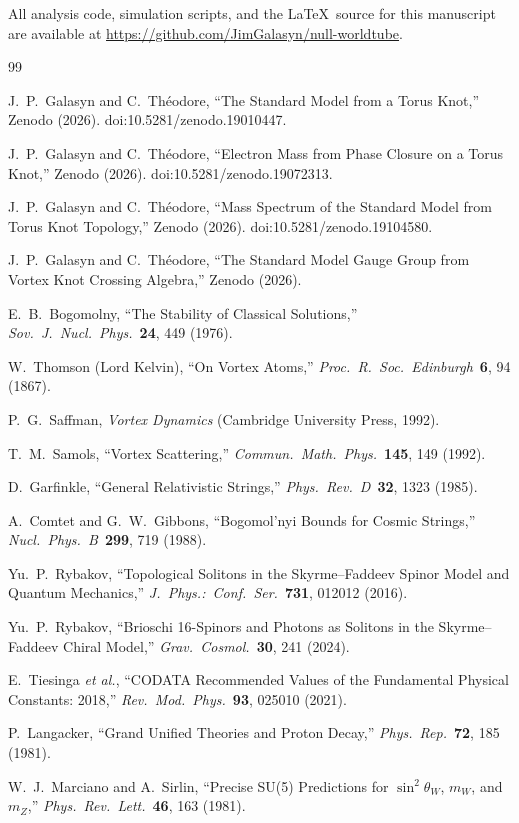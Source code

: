 \documentclass[11pt]{article}
\begin{document}
All analysis code, simulation scripts, and the \LaTeX\ source for this manuscript are available at \url{https://github.com/JimGalasyn/null-worldtube}.

\begin{thebibliography}{99}

J.~P.~Galasyn and C.~Th\'eodore,
``The Standard Model from a Torus Knot,''
Zenodo (2026). doi:10.5281/zenodo.19010447.

J.~P.~Galasyn and C.~Th\'eodore,
``Electron Mass from Phase Closure on a Torus Knot,''
Zenodo (2026). doi:10.5281/zenodo.19072313.

J.~P.~Galasyn and C.~Th\'eodore,
``Mass Spectrum of the Standard Model from Torus Knot Topology,''
Zenodo (2026). doi:10.5281/zenodo.19104580.

J.~P.~Galasyn and C.~Th\'eodore,
``The Standard Model Gauge Group from Vortex Knot Crossing Algebra,''
Zenodo (2026).

E.~B.~Bogomolny,
``The Stability of Classical Solutions,''
\emph{Sov.\ J.\ Nucl.\ Phys.}\ \textbf{24}, 449 (1976).

W.~Thomson (Lord Kelvin),
``On Vortex Atoms,''
\emph{Proc.\ R.\ Soc.\ Edinburgh}\ \textbf{6}, 94 (1867).

P.~G.~Saffman,
\emph{Vortex Dynamics} (Cambridge University Press, 1992).

T.~M.~Samols,
``Vortex Scattering,''
\emph{Commun.\ Math.\ Phys.}\ \textbf{145}, 149 (1992).

D.~Garfinkle,
``General Relativistic Strings,''
\emph{Phys.\ Rev.\ D}\ \textbf{32}, 1323 (1985).

A.~Comtet and G.~W.~Gibbons,
``Bogomol'nyi Bounds for Cosmic Strings,''
\emph{Nucl.\ Phys.\ B}\ \textbf{299}, 719 (1988).

Yu.~P.~Rybakov,
``Topological Solitons in the Skyrme--Faddeev Spinor Model and
Quantum Mechanics,''
\emph{J.\ Phys.:\ Conf.\ Ser.}\ \textbf{731}, 012012 (2016).

Yu.~P.~Rybakov,
``Brioschi 16-Spinors and Photons as Solitons in the Skyrme--Faddeev
Chiral Model,''
\emph{Grav.\ Cosmol.}\ \textbf{30}, 241 (2024).

E.~Tiesinga \emph{et al.},
``CODATA Recommended Values of the Fundamental Physical Constants:
2018,''
\emph{Rev.\ Mod.\ Phys.}\ \textbf{93}, 025010 (2021).

P.~Langacker,
``Grand Unified Theories and Proton Decay,''
\emph{Phys.\ Rep.}\ \textbf{72}, 185 (1981).

W.~J.~Marciano and A.~Sirlin,
``Precise SU(5) Predictions for $\sin^2\theta_W$, $m_W$, and $m_Z$,''
\emph{Phys.\ Rev.\ Lett.}\ \textbf{46}, 163 (1981).

\end{thebibliography}
\end{document}
